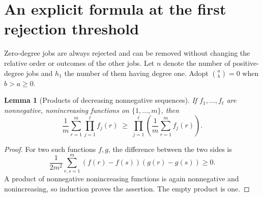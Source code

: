 \documentclass[11pt]{article}
\newtheorem{lemma}{Lemma}
\begin{document}
\section{An explicit formula at the first rejection threshold}
Zero-degree jobs are always rejected and can be removed without changing
the relative order or outcomes of the other jobs. Let $n$ denote the number
of positive-degree jobs and $h_1$ the number of them having degree one.
Adopt $\binom ab=0$ when $b>a\geq0$.

\begin{lemma}[Products of decreasing nonnegative sequences]\label{lem:products}
If $f_1,\ldots,f_\ell$ are nonnegative, nonincreasing functions on
$\{1,\ldots,m\}$, then
\[
 \frac1m\sum_{r=1}^m\prod_{j=1}^\ell f_j(r)
 \;\geq\;\prod_{j=1}^\ell\left(\frac1m\sum_{r=1}^m f_j(r)\right).
\]
\end{lemma}
\begin{proof}
For two such functions $f,g$, the difference between the two sides is
\[
 \frac{1}{2m^2}\sum_{r,s=1}^m(f(r)-f(s))(g(r)-g(s))\geq0.
\]
A product of nonnegative nonincreasing functions is again nonnegative
and nonincreasing, so induction proves the assertion. The empty product
is one.
\end{proof}
\end{document}
